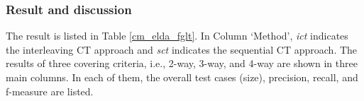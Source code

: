 \documentclass{sig-alternate}
\begin{document}




\subsubsection{Result and discussion}

The result is listed in Table \ref{cm_elda_fglt}. In Column `Method', \emph{ict} indicates the interleaving CT approach and \emph{sct} indicates the sequential CT approach. The results of three covering criteria, i.e., 2-way, 3-way, and 4-way are shown in three main columns. In each of them, the overall test cases (size), precision, recall, and f-measure are listed.
\end{document}
